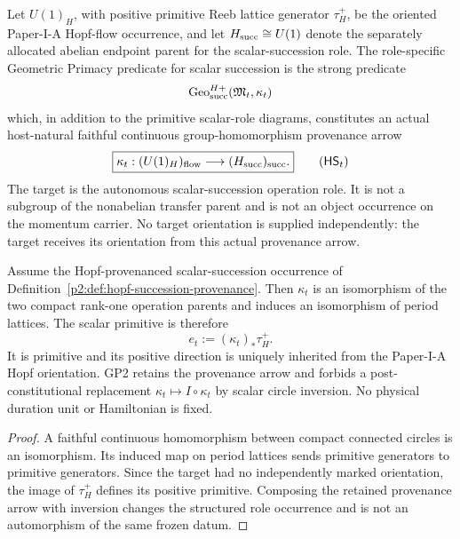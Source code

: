 \documentclass[12pt,a4paper]{article}
\begin{document}
\begin{definition}
\label{p2:def:hopf-succession-provenance}
Let \(U(1)_H\), with positive primitive Reeb lattice generator
\(\tau_H^+\), be the oriented Paper-I-A Hopf-flow occurrence, and let
\(H_{\rm succ}\cong U(1)\) denote the separately allocated abelian endpoint
parent for the scalar-succession role.  The role-specific Geometric Primacy
predicate for scalar succession is the strong predicate
\[
 \operatorname{Geo}^{H+}_{\rm succ}(\mathfrak M_t,\kappa_t)
\]
which, in addition to the primitive scalar-role diagrams, constitutes an
actual host-natural faithful continuous group-homomorphism provenance arrow
\[
 \boxed{
 \kappa_t:(U(1)_H)_{\rm flow}
          \longrightarrow (H_{\rm succ})_{\rm succ}.}
 \tag{\ensuremath{\mathsf{HS}_t}}
\]
The target is the autonomous scalar-succession operation role.  It is not a
subgroup of the nonabelian transfer parent and is not an object occurrence on
the momentum carrier.  No target orientation is supplied independently: the
target receives its orientation from this actual provenance arrow.
\end{definition}

\begin{theorem}
\label{p2:thm:transported-succession-orientation}
Assume the Hopf-provenanced scalar-succession occurrence of
Definition~\ref{p2:def:hopf-succession-provenance}.  Then \(\kappa_t\) is an
isomorphism of the two compact rank-one operation parents and induces an
isomorphism of period lattices.  The scalar primitive is therefore
\[
 \boxed{e_t:=(\kappa_t)_*\tau_H^+.}
\]
It is primitive and its positive direction is uniquely inherited from the
Paper-I-A Hopf orientation.  GP2 retains the provenance arrow and forbids a
post-constitutional replacement \(\kappa_t\mapsto I\circ\kappa_t\) by scalar
circle inversion.  No physical duration unit or Hamiltonian is fixed.
\end{theorem}

\begin{proof}
A faithful continuous homomorphism between compact connected circles is an
isomorphism.  Its induced map on period lattices sends primitive generators
to primitive generators.  Since the target had no independently marked
orientation, the image of \(\tau_H^+\) defines its positive primitive.
Composing the retained provenance arrow with inversion changes the structured
role occurrence and is not an automorphism of the same frozen datum.
\end{proof}
\end{document}
